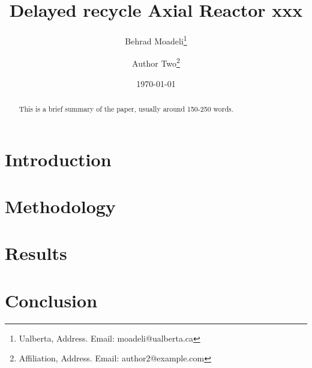 \documentclass[letterpaper,11pt]{article}
\title{Delayed recycle Axial Reactor xxx}
\author{
  Behrad Moadeli\thanks{Ualberta, Address. Email: moadeli@ualberta.ca} \and
  Author Two\thanks{Affiliation, Address. Email: author2@example.com}
}
\date{\today}
\begin{document}
\maketitle

\begin{abstract}
    This is a brief summary of the paper, usually around 150-250 words. \lipsum[1-1]
\end{abstract}

\section{Introduction}


\section{Methodology}


\section{Results}


\section{Conclusion}


\printbibliography
\end{document}
